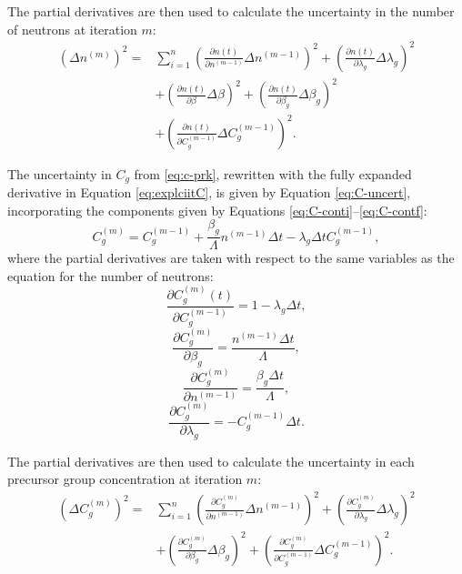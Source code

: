 \documentclass{style/nseJournal}
\begin{document}
The partial derivatives are then used to calculate the uncertainty in the number of neutrons at iteration $m$:
\begin{equation}
\begin{split}
\left( \Delta n^{(m)} \right) ^2= & \sum_{i=1}^n\left( \frac{\partial n(t)}{\partial n^{(m-1)}} \Delta n^{(m-1)} \right)^2 + \left( \frac{\partial n(t)}{\partial \lambda_g} \Delta \lambda_g \right)^2 \\
 & + \left( \frac{\partial n(t)}{\partial \beta} \Delta \beta \right)^2 + \left( \frac{\partial n(t)}{\partial \beta_g} \Delta \beta_g \right)^2 \\
 & + \left( \frac{\partial n(t)}{\partial C_g^{(m-1)}} \Delta C_g^{(m-1)} \right)^2.
\end{split}
\label{eq:n-uncert}
\end{equation}

The uncertainty in $C_g$ from \eqref{eq:c-prk}, rewritten with the fully expanded derivative in Equation \eqref{eq:explciitC}, is given by Equation \eqref{eq:C-uncert}, incorporating the components given by Equations \eqref{eq:C-conti}--\eqref{eq:C-contf}:
\begin{equation}
C_g^{(m)} = C_g^{(m-1)} + \frac{\beta_g}{\Lambda} n^{(m-1)} \Delta t - \lambda_g \Delta t C_g^{(m-1)},
\label{eq:explciitC}
\end{equation}
where the partial derivatives are taken with respect to the same variables as the equation for the number of neutrons:
\begin{equation}
\frac{\partial C_g^{(m)}(t)}{\partial C_g^{(m-1)}} = 1 - \lambda_g \Delta t
\label{eq:C-conti},
\end{equation}
\begin{equation}
\frac{\partial C_g^{(m)}}{\partial \beta_g} = \frac{n^{(m-1)} \Delta t}{\Lambda},
\end{equation}
\begin{equation}
\frac{\partial C_g^{(m)}}{\partial n^{(m-1)}} = \frac{\beta_g \Delta t}{\Lambda},
\end{equation}
\begin{equation}
\frac{\partial C_g^{(m)}}{\partial \lambda_g} = - C_g^{(m-1)} \Delta t
\label{eq:C-contf}.
\end{equation}

The partial derivatives are then used to calculate the uncertainty in each precursor group concentration at iteration $m$:
\begin{equation}
\begin{split}
\left( \Delta C_g^{(m)} \right)^2 = & \sum_{i=1}^n\left( \frac{\partial C_g^{(m)}}{\partial n^{(m-1)}} \Delta n^{(m-1)} \right)^2 + \left( \frac{\partial C_g^{(m)}}{\partial \lambda_g} \Delta \lambda_g \right)^2 \\
& + \left( \frac{\partial C_g^{(m)}}{\partial \beta_g} \Delta \beta_g \right)^2 + \left( \frac{\partial C_g^{(m)}}{\partial C_g^{(m-1)}} \Delta C_g^{(m-1)} \right)^2 .
\label{eq:C-uncert}
\end{split}
\end{equation}
\end{document}
